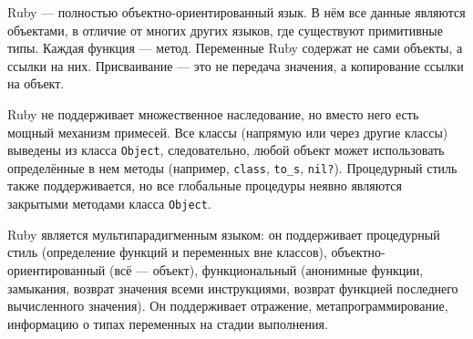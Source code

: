 \documentclass[utf8,a5paper,portrait,12pt]{eskdtext}
\begin{document}
Ruby — полностью объектно-ориентированный язык. В нём все данные являются
объектами, в отличие от многих других языков, где существуют примитивные типы.
Каждая функция — метод. Переменные Ruby содержат не сами объекты, а ссылки на
них. Присваивание — это не передача значения, а копирование ссылки на
объект\cite{ruby}.

Ruby не поддерживает множественное наследование, но вместо него есть мощный
механизм примесей. Все классы (напрямую или через другие классы) выведены из
класса \texttt{Object}, следовательно, любой объект может использовать
определённые в нем методы (например, \texttt{class}, \texttt{to\_s},
\texttt{nil?}). Процедурный стиль также поддерживается, но все глобальные
процедуры неявно являются закрытыми методами класса \texttt{Object}.

Ruby является мультипарадигменным языком: он поддерживает процедурный стиль
(определение функций и переменных вне классов), объектно-ориентированный
(всё — объект), функциональный (анонимные функции, замыкания, возврат значения
всеми инструкциями, возврат функцией последнего вычисленного значения).
Он поддерживает отражение, метапрограммирование, информацию о типах переменных
на стадии выполнения.
\end{document}
